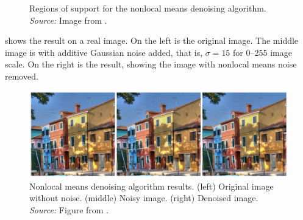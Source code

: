\begin{figure}[t]
\centerline{
}
\caption{Regions of support for the nonlocal means denoising algorithm. 
{\em Source:} Image from \cite{Baudes2005}.}
\label{fig:nlm1}
\end{figure}

\Fig{\ref{fig:nlm2}} shows the result on a real image.  On the left is the original image. The middle image is with additive Gaussian noise added, that is, $\sigma=15$ for 0–255 image scale. On the right is the result, showing the image with nonlocal means noise removed.


\begin{figure}[t]
\centerline{
\includegraphics[width=1\linewidth]{figures/statistical_image_models/nlmresult.jpg}
}
\caption{Nonlocal means denoising algorithm results. (left) Original image without noise. (middle) Noisy image. (right) Denoised image. {\em Source:} Figure from \cite{Baudes2011}.
}
\label{fig:nlm2}
\end{figure}




%
%
%

